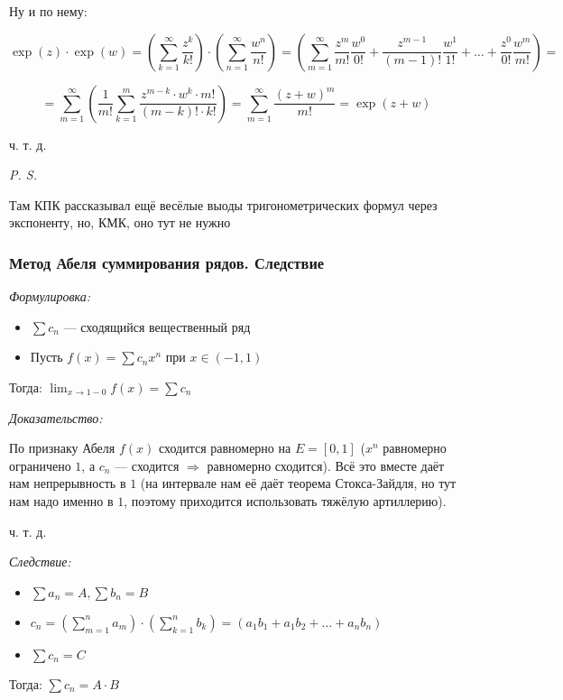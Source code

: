 \documentclass{article}
\begin{document}
Ну и по нему: 

\[\exp(z) \cdot \exp(w) = \left(\sum_{k = 1}^{\infty} \frac{z^k}{k!} \right) \cdot \left(\sum_{n = 1}^{\infty} \frac{w^n}{n!} \right) = \left(\sum_{m = 1}^{\infty} \frac{z^m}{m!}\frac{w^0}{0!} + \frac{z^{m - 1}}{(m - 1)!}\frac{w^1}{1!} + \ldots + \frac{z^0}{0!}\frac{w^m}{m!}\right) =\]

\[= \sum_{m = 1}^{\infty} \left(\frac{1}{m!} \sum_{k = 1}^{m} \frac{z^{m - k} \cdot w^k \cdot m!}{(m - k)! \cdot k!}\right) = \sum_{m = 1}^{\infty}\frac{(z + w)^m}{m!} = \exp(z + w)\]

ч. т. д.

\textit{P. S.}

Там КПК рассказывал ещё весёлые выоды тригонометрических формул через экспоненту, но, КМК, оно тут не нужно

\subsubsection{Метод Абеля суммирования рядов. Следствие}
\textit{Формулировка:}

\begin{itemize}
    \item $\sum c_n$ --- сходящийся вещественный ряд
    \item Пусть $f(x) = \sum c_nx^n$ при $x \in (-1, 1)$
\end{itemize}

Тогда: $\lim_{x \rightarrow 1 - 0} f(x) = \sum c_n$

\textit{Доказательство:}

По признаку Абеля $f(x)$ сходится равномерно на $E = [0, 1]$ ($x^n$ равномерно ограничено $1$, а $c_n$ --- сходится $\Rightarrow$ равномерно сходится). Всё это вместе даёт нам непрерывность в $1$ (на интервале нам её даёт теорема Стокса-Зайдля, но тут нам надо именно в $1$, поэтому приходится использовать тяжёлую артиллерию).

ч. т. д.

\textit{Следствие:}

\begin{itemize}
    \item $\sum a_n = A, \sum b_n = B$
    \item $c_n = \left(\sum_{m = 1}^{n} a_m \right) \cdot \left(\sum_{k = 1}^{n} b_k \right) = (a_1b_1 + a_1b_2 + \ldots + a_nb_n)$
    \item $\sum c_n = C$
\end{itemize}

Тогда: $\sum c_n = A \cdot B$
\end{document}
